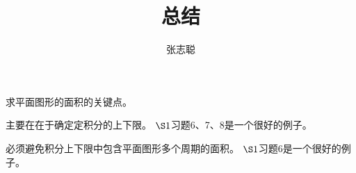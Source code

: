 \documentclass{article}
\begin{document}
\title{总结}
\author{张志聪}
\maketitle

\begin{zremark}
  求平面图形的面积的关键点。
\end{zremark}

主要在在于确定定积分的上下限。
$\S 1$习题6、7、8是一个很好的例子。

必须避免积分上下限中包含平面图形多个周期的面积。
$\S 1$习题6是一个很好的例子。
\end{document}
